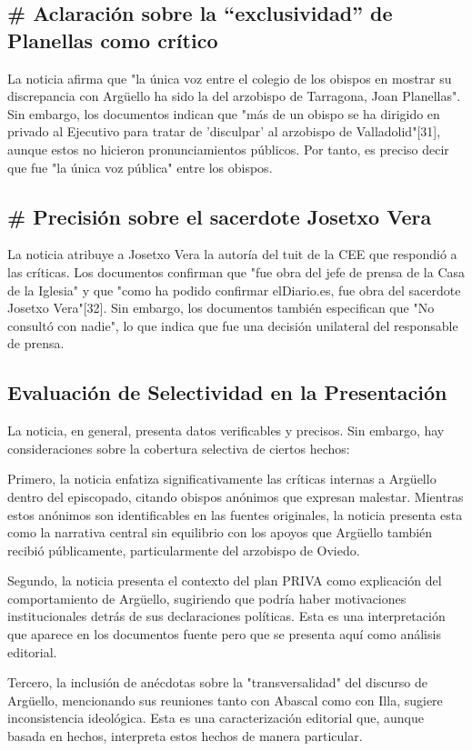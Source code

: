 \documentclass[10pt,a4paper]{article}
\begin{document}
\subsection*{\# Aclaraci\'{o}n sobre la ``exclusividad'' de Planellas como cr\'{i}tico}

 La noticia afirma que "la \'{u}nica voz entre el colegio de los obispos en mostrar su discrepancia con Arg\"{u}ello ha sido la del arzobispo de Tarragona, Joan Planellas". Sin embargo, los documentos indican que "m\'{a}s de un obispo se ha dirigido en privado al Ejecutivo para tratar de 'disculpar' al arzobispo de Valladolid"[31], aunque estos no hicieron pronunciamientos p\'{u}blicos. Por tanto, es preciso decir que fue "la \'{u}nica voz p\'{u}blica" entre los obispos. 

\subsection*{\# Precisi\'{o}n sobre el sacerdote Josetxo Vera}

 La noticia atribuye a Josetxo Vera la autor\'{i}a del tuit de la CEE que respondi\'{o} a las cr\'{i}ticas. Los documentos confirman que "fue obra del jefe de prensa de la Casa de la Iglesia" y que "como ha podido confirmar elDiario.es, fue obra del sacerdote Josetxo Vera"[32]. Sin embargo, los documentos tambi\'{e}n especifican que "No consult\'{o} con nadie", lo que indica que fue una decisi\'{o}n unilateral del responsable de prensa. 

\subsection*{Evaluaci\'{o}n de Selectividad en la Presentaci\'{o}n}

 La noticia, en general, presenta datos verificables y precisos. Sin embargo, hay consideraciones sobre la cobertura selectiva de ciertos hechos:
\par\medskip
Primero, la noticia enfatiza significativamente las cr\'{i}ticas internas a Arg\"{u}ello dentro del episcopado, citando obispos an\'{o}nimos que expresan malestar. Mientras estos an\'{o}nimos son identificables en las fuentes originales, la noticia presenta esta como la narrativa central sin equilibrio con los apoyos que Arg\"{u}ello tambi\'{e}n recibi\'{o} p\'{u}blicamente, particularmente del arzobispo de Oviedo.
\par\medskip
Segundo, la noticia presenta el contexto del plan PRIVA como explicaci\'{o}n del comportamiento de Arg\"{u}ello, sugiriendo que podr\'{i}a haber motivaciones institucionales detr\'{a}s de sus declaraciones pol\'{i}ticas. Esta es una interpretaci\'{o}n que aparece en los documentos fuente pero que se presenta aqu\'{i} como an\'{a}lisis editorial.
\par\medskip
Tercero, la inclusi\'{o}n de an\'{e}cdotas sobre la "transversalidad" del discurso de Arg\"{u}ello, mencionando sus reuniones tanto con Abascal como con Illa, sugiere inconsistencia ideol\'{o}gica. Esta es una caracterizaci\'{o}n editorial que, aunque basada en hechos, interpreta estos hechos de manera particular. 
\end{document}
